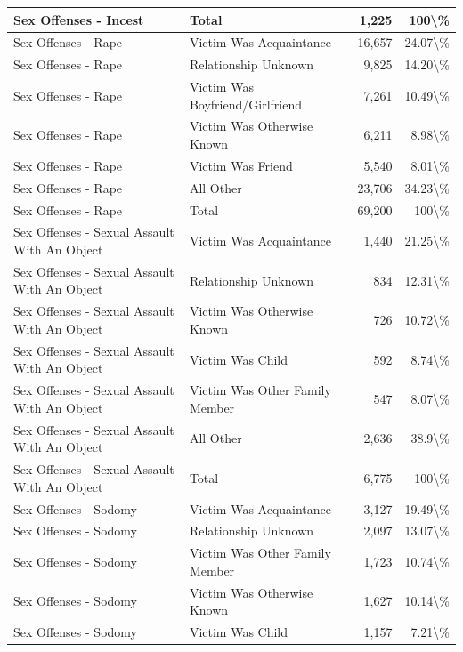 \documentclass[
]{krantz}
\begin{document}
\begin{longtable}[t]{l|l|r|r}
\hline
Sex Offenses - Incest & Total & 1,225 & 100\textbackslash{}\%\\
\hline
Sex Offenses - Rape & Victim Was Acquaintance & 16,657 & 24.07\textbackslash{}\%\\
\hline
Sex Offenses - Rape & Relationship Unknown & 9,825 & 14.20\textbackslash{}\%\\
\hline
Sex Offenses - Rape & Victim Was Boyfriend/Girlfriend & 7,261 & 10.49\textbackslash{}\%\\
\hline
Sex Offenses - Rape & Victim Was Otherwise Known & 6,211 & 8.98\textbackslash{}\%\\
\hline
Sex Offenses - Rape & Victim Was Friend & 5,540 & 8.01\textbackslash{}\%\\
\hline
Sex Offenses - Rape & All Other & 23,706 & 34.23\textbackslash{}\%\\
\hline
Sex Offenses - Rape & Total & 69,200 & 100\textbackslash{}\%\\
\hline
Sex Offenses - Sexual Assault With An Object & Victim Was Acquaintance & 1,440 & 21.25\textbackslash{}\%\\
\hline
Sex Offenses - Sexual Assault With An Object & Relationship Unknown & 834 & 12.31\textbackslash{}\%\\
\hline
Sex Offenses - Sexual Assault With An Object & Victim Was Otherwise Known & 726 & 10.72\textbackslash{}\%\\
\hline
Sex Offenses - Sexual Assault With An Object & Victim Was Child & 592 & 8.74\textbackslash{}\%\\
\hline
Sex Offenses - Sexual Assault With An Object & Victim Was Other Family Member & 547 & 8.07\textbackslash{}\%\\
\hline
Sex Offenses - Sexual Assault With An Object & All Other & 2,636 & 38.9\textbackslash{}\%\\
\hline
Sex Offenses - Sexual Assault With An Object & Total & 6,775 & 100\textbackslash{}\%\\
\hline
Sex Offenses - Sodomy & Victim Was Acquaintance & 3,127 & 19.49\textbackslash{}\%\\
\hline
Sex Offenses - Sodomy & Relationship Unknown & 2,097 & 13.07\textbackslash{}\%\\
\hline
Sex Offenses - Sodomy & Victim Was Other Family Member & 1,723 & 10.74\textbackslash{}\%\\
\hline
Sex Offenses - Sodomy & Victim Was Otherwise Known & 1,627 & 10.14\textbackslash{}\%\\
\hline
Sex Offenses - Sodomy & Victim Was Child & 1,157 & 7.21\textbackslash{}\%\\

\end{longtable}
\end{document}
